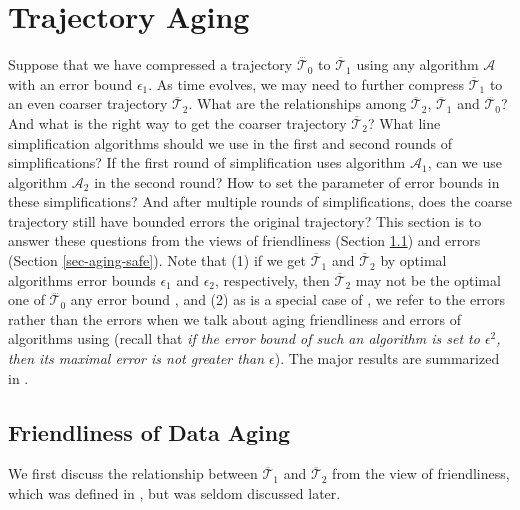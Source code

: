 
{\section{Trajectory Aging}}
\label{sec-aging}

Suppose that we have compressed a trajectory $\dddot{\mathcal{T}_0}$ to $\overline{\mathcal{T}}_1$ using any \lsa algorithm $\mathcal{A}$ with an error bound $\epsilon_1$. As time evolves, we may need to further compress $\overline{\mathcal{T}}_1$ to an even coarser trajectory $\overline{\mathcal{T}}_2$.
What are the relationships among $\overline{\mathcal{T}}_2$, $\overline{\mathcal{T}}_1$ and $\dddot{\mathcal{T}_0}$? And what is the right way to get the coarser trajectory $\overline{\mathcal{T}}_2$?
{What line simplification algorithms should we use in the first and second rounds of simplifications? If the first round of simplification uses algorithm $\mathcal{A}_1$, can we use algorithm $\mathcal{A}_2$ in the second round? How to set the parameter of error bounds in these simplifications? And after multiple rounds of simplifications, does the coarse trajectory still have bounded errors \wrt the original trajectory?}
%
This section is to answer these questions from the views of friendliness \cite{Cao:Spatio} (Section \ref{sec-aging-friend}) and errors (Section \ref{sec-aging-safe}).
Note that (1) if we get $\overline{\mathcal{T}}_1$ and $\overline{\mathcal{T}}_2$ by optimal algorithms \wrt error bounds $\epsilon_1$ and $\epsilon_2$, respectively, then $\overline{\mathcal{T}}_2$ may not be the optimal one of $\dddot{\mathcal{T}_0}$ \wrt any error bound \cite{Cao:Spatio}, {and (2) as \lissed is a special case of \sed, we refer to the \sed errors rather than the \lissed errors when we talk about aging friendliness and errors of algorithms using \lissed (recall that \emph{if the \lissed error bound of such an algorithm  is set to $\epsilon^2$, then its maximal \sed error is not greater than $\epsilon$})}. The major results are summarized in .


\subsection{Friendliness of Data Aging}
\label{sec-aging-friend}
We first discuss the relationship between $\overline{\mathcal{T}}_1$ and $\overline{\mathcal{T}}_2$ from the view of friendliness, which was defined in \cite{Cao:Spatio}, but was seldom discussed later.
	
